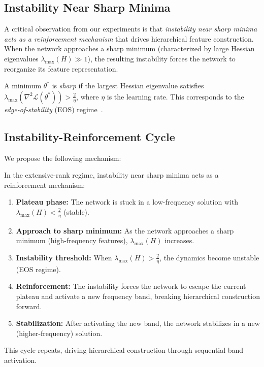 \subsection{Instability Near Sharp Minima}

A critical observation from our experiments is that \emph{instability near sharp minima acts as a reinforcement mechanism} that drives hierarchical feature construction. When the network approaches a sharp minimum (characterized by large Hessian eigenvalues $\lambda_{\max}(H) \gg 1$), the resulting instability forces the network to reorganize its feature representation.

\begin{definition}
A minimum $\theta^*$ is \emph{sharp} if the largest Hessian eigenvalue satisfies $\lambda_{\max}(\nabla^2 \mathcal{L}(\theta^*)) > \frac{2}{\eta}$, where $\eta$ is the learning rate. This corresponds to the \emph{edge-of-stability} (EOS) regime~\cite{cohen2021gradient}.
\end{definition}

\subsection{Instability-Reinforcement Cycle}

We propose the following mechanism:

\begin{theorem}
\label{thm:instability-reinforcement}
In the extensive-rank regime, instability near sharp minima acts as a reinforcement mechanism:
\begin{enumerate}
    \item \textbf{Plateau phase:} The network is stuck in a low-frequency solution with $\lambda_{\max}(H) < \frac{2}{\eta}$ (stable).
    \item \textbf{Approach to sharp minimum:} As the network approaches a sharp minimum (high-frequency features), $\lambda_{\max}(H)$ increases.
    \item \textbf{Instability threshold:} When $\lambda_{\max}(H) > \frac{2}{\eta}$, the dynamics become unstable (EOS regime).
    \item \textbf{Reinforcement:} The instability forces the network to escape the current plateau and activate a new frequency band, breaking hierarchical construction forward.
    \item \textbf{Stabilization:} After activating the new band, the network stabilizes in a new (higher-frequency) solution.
\end{enumerate}
This cycle repeats, driving hierarchical construction through sequential band activation.
\end{theorem}

